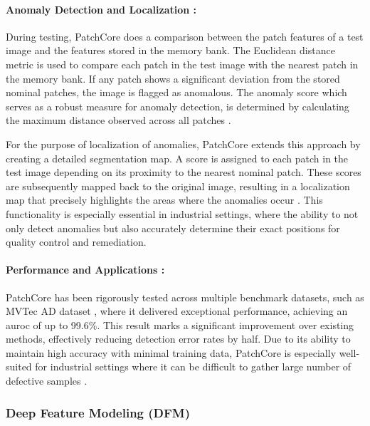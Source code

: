 \paragraph*{Anomaly Detection and Localization :}

During testing, PatchCore does a comparison between the patch features of a test image and the features stored in the memory bank. The Euclidean distance metric is used to compare each patch in the test image with the nearest patch in the memory bank. If any patch shows a significant deviation from the stored nominal patches, the image is flagged as anomalous. The anomaly score which serves as a robust measure for anomaly detection, is determined by calculating the maximum distance observed across all patches \cite{roth2022totalrecallindustrialanomaly}.

For the purpose of localization of anomalies, PatchCore extends this approach by creating a detailed segmentation map. A score is assigned to each patch in the test image depending on its proximity to the nearest nominal patch. These scores are subsequently mapped back to the original image, resulting in a localization map that precisely highlights the areas where the anomalies occur \cite{roth2022totalrecallindustrialanomaly}. This functionality is especially essential in industrial settings, where the ability to not only detect anomalies but also accurately determine their exact positions for quality control and remediation.

\paragraph*{Performance and Applications :}

PatchCore has been rigorously tested across multiple benchmark datasets, such as MVTec AD dataset \cite{8954181}, where it delivered exceptional performance, achieving an \gls{auroc} of up to 99.6\%. This result marks a significant improvement over existing methods, effectively reducing detection error rates by half. Due to its ability to maintain high accuracy with minimal training data, PatchCore is especially well-suited for industrial settings where it can be difficult to gather large number of defective samples \cite{roth2022totalrecallindustrialanomaly}.

\subsubsection{Deep Feature Modeling (DFM)}
\label{subsec:dfm}

